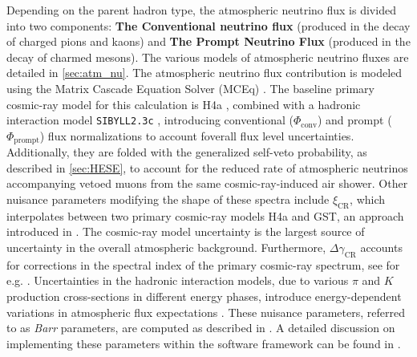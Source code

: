 Depending on the parent hadron type, the atmospheric neutrino flux is divided into two components: \textbf{The Conventional neutrino flux} (produced in the decay of charged pions and kaons) and \textbf{The Prompt Neutrino Flux} (produced in the decay of charmed mesons). The various models of atmospheric neutrino fluxes are detailed in \ref{sec:atm_nu}. The atmospheric neutrino flux contribution is modeled using the Matrix Cascade Equation Solver (MCEq) . The baseline primary cosmic-ray model for this calculation is H4a , combined with a hadronic interaction model \texttt{SIBYLL2.3c} , introducing conventional ($\Phi_{\mathrm{conv}}$) and prompt ($\Phi_{\mathrm{prompt}}$) flux normalizations to account foverall flux level uncertainties. Additionally, they are folded with the generalized self-veto probability, as described in \ref{sec:HESE}, to account for the reduced rate of atmospheric neutrinos accompanying vetoed muons from the same cosmic-ray-induced air shower. Other nuisance parameters modifying the shape of these spectra include $\xi_{\mathrm{CR}}$, which interpolates between two primary cosmic-ray models H4a and GST, an approach introduced in . The cosmic-ray model uncertainty is the largest source of uncertainty in the overall atmospheric background. Furthermore, $\Delta\gamma_{\mathrm{CR}}$ accounts for corrections in the spectral index of the primary cosmic-ray spectrum, see for e.g. . Uncertainties in the hadronic interaction models, due to various $\pi$ and $K$ production cross-sections in different energy phases, introduce energy-dependent variations in atmospheric flux expectations . These nuisance parameters, referred to as \emph{Barr} parameters, are computed as described in . A detailed discussion on implementing these parameters within the software framework can be found in .

